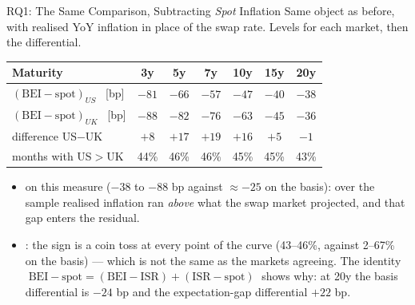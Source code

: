 \begin{frame}[t]{RQ1: The Same Comparison, Subtracting \emph{Spot} Inflation}
\vspace{0.05cm}
\footnotesize
Same object as before, with realised YoY inflation in place of the swap rate. Levels for each
market, then the differential.

\vspace{0.15cm}
\centering
{\footnotesize
\begin{tabular}{lcccccc}
\toprule
Maturity & 3y & 5y & 7y & 10y & 15y & 20y \\
\midrule
$(\text{BEI}-\text{spot})_{US}$ \ [bp] & $-81$ & $-66$ & $-57$ & $-47$ & $-40$ & $-38$ \\
$(\text{BEI}-\text{spot})_{UK}$ \ [bp] & $-88$ & $-82$ & $-76$ & $-63$ & $-45$ & $-36$ \\
\midrule
difference US$-$UK      & $+8$ & $+17$ & $+19$ & $+16$ & $+5$ & $-1$ \\
months with US$>$UK     & 44\% & 46\% & 46\% & 45\% & 45\% & 43\% \\
\bottomrule
\end{tabular}}

\vspace{0.25cm}
\raggedright\scriptsize
\begin{itemize}\itemsep=0.09cm\scriptsize
  \item {} on this measure ($-38$ to $-88$ bp against
        $\approx-25$ on the basis): over the sample realised inflation ran \emph{above} what
        the swap market projected, and that gap enters the residual.
  \item {}: the sign is a coin toss at every point of the curve
        (43--46\%, against 2--67\% on the basis) --- which is not the same as the markets
        agreeing. The identity
        $\;\text{BEI}-\text{spot}=(\text{BEI}-\text{ISR})+(\text{ISR}-\text{spot})\;$
        shows why: at 20y the basis differential is $-24$ bp and the expectation-gap
        differential $+22$ bp. 
\end{itemize}
\end{frame}

